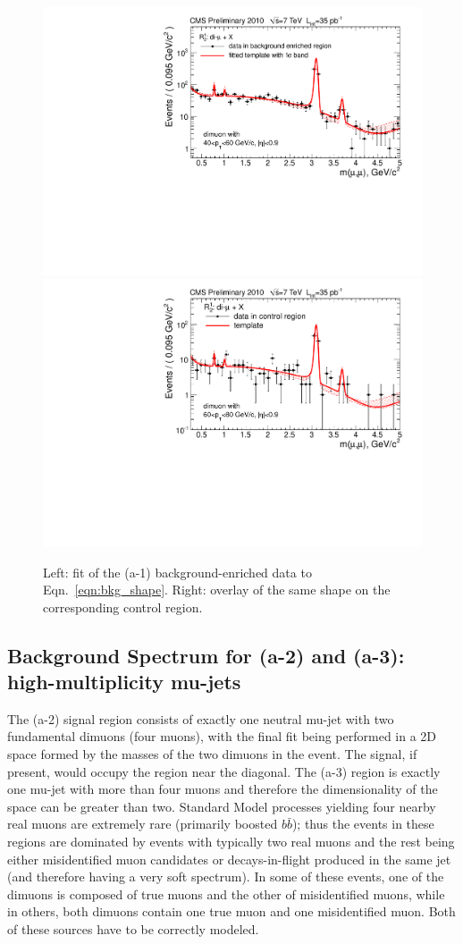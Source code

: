 \begin{figure}
\includegraphics[width=0.5\linewidth]{PLOTS/template__bkg_model_a1__m_1_log.pdf}
\includegraphics[width=0.5\linewidth]{PLOTS/template_control__bkg_model_a1__m_1_log.pdf}
\caption{Left: fit of the (a-1) background-enriched data to
  Eqn.~\ref{eqn:bkg_shape}.  Right: overlay of the same shape on the
  corresponding control region. \label{fig:backgroundEnriched_highpt}}
\end{figure}

\subsection{Background Spectrum for (a-2) and (a-3): high-multiplicity mu-jets}
\label{sec:background_spectrum_for_a_2}

The (a-2) signal region consists of exactly one neutral mu-jet with
two fundamental dimuons (four muons), with the final fit being
performed in a 2D space formed by the masses of the two dimuons in the
event. The signal, if present, would occupy the region near the
diagonal. The (a-3) region is exactly one mu-jet with more than four
muons and therefore the dimensionality of the space can be greater
than two.  Standard Model processes yielding four nearby real muons
are extremely rare (primarily boosted $b\bar{b}$); thus the events in
these regions are dominated by events with typically two real muons
and the rest being either misidentified muon candidates or
decays-in-flight produced in the same jet (and therefore having a very
soft spectrum). In some of these events, one of the dimuons is
composed of true muons and the other of misidentified muons, while in
others, both dimuons contain one true muon and one misidentified
muon. Both of these sources have to be correctly modeled.

